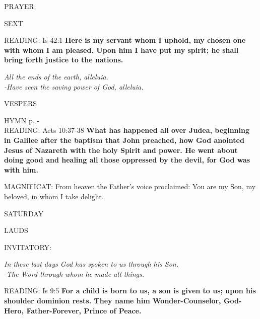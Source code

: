 \noindent\small{\uppercase{PRAYER:}}	

\begin{flushleft}\normalsize{\uppercase{SEXT\\}}\end{flushleft}
\noindent\small{\uppercase{READING:}}    Is 42:1 \textbf{   Here is my servant whom I uphold, my chosen one with whom I am pleased. Upon him I have put my spirit; he shall bring forth justice to the nations.}
\begin{center}\textit{All the ends of the earth, alleluia.\\
-Have seen the saving power of God, alleluia.}\end{center}

\begin{flushleft}\normalsize{\uppercase{VESPERS\\}}\end{flushleft}
\small{\uppercase{HYMN} p. \pageref{christmas:firstHymn}-\pageref{christmas:lastHymn}\\}
\noindent\small{\uppercase{READING:}}    Acts 10:37-38 \textbf{   What has happened all over Judea, beginning in Galilee after the baptism that John preached, how God anointed Jesus of Nazareth with the holy Spirit and power. He went about doing good and healing all those oppressed by the devil, for God was with him.\\}

\noindent\small{\uppercase{MAGNIFICAT:}}	From heaven the Father's voice proclaimed: You are my Son, my beloved, in whom I take delight.

\begin{center}
\normalsize SATURDAY
\end{center}

\begin{flushleft}\normalsize{\uppercase{LAUDS\\}}\end{flushleft}
\small{\uppercase{INVITATORY:}}\normalsize
\begin{center}
\textit{In these last days God has spoken to us through his Son.\\}
\textit{-The Word through whom he made all things.\\}
\end{center}
\noindent\small{\uppercase{READING:}}    Is 9:5 \textbf{   For a child is born to us, a son is given to us; upon his shoulder dominion rests. They name him Wonder-Counselor, God-Hero, Father-Forever, Prince of Peace.\\}

